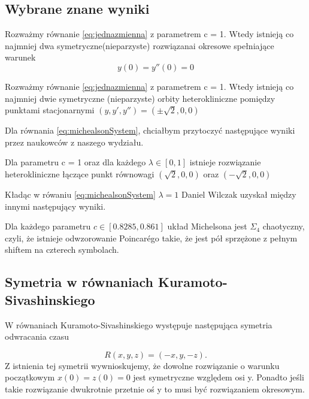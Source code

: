 \subsection{Wybrane znane wyniki} 

\begin{theorem}[Troy]
 
Rozważmy równanie \ref{eq:jednazmienna} z parametrem c = 1. Wtedy istnieją co najmniej dwa symetryczne(nieparzyste) rozwiązanai okresowe
spełniające warunek
$$
    y(0) = y''(0) = 0
$$
\end{theorem}

\begin{theorem} [Troy]
 Rozważmy równanie \ref{eq:jednazmienna} z parametrem c = 1. Wtedy istnieją co najmniej dwie symetryczne (nieparzyste) orbity
 heterokliniczne pomiędzy punktami stacjonarnymi $(y,y',y'') = (\pm \sqrt{2},0,0)$
 
\end{theorem}
Dla równania \eqref{eq:michealsonSystem}, chciałbym przytoczyć następujące wyniki przez naukowców z naszego wydziału.


\begin{theorem} 
  Dla parametru c = 1 oraz dla każdego $ \lambda \in [0,1] $ istnieje rozwiązanie heterokliniczne łączące punkt równowagi $(\sqrt{2},0,0) $ 
  oraz $(-\sqrt{2},0,0)$
 
\end{theorem}

Kładąc w rówaniu \eqref{eq:michealsonSystem} $ \lambda = 1 $
Daniel Wilczak uzyskał między innymi następujący wyniki.

\begin{theorem}[Wilczak]
  Dla każdego parametru $ c \in [0.8285,0.861] $ układ Michelsona jest $ \Sigma_4 $ chaotyczny,
  czyli, że istnieje odwzorowanie Poincar\'ego takie, że jest pół sprzężone z pełnym shiftem na czterech symbolach.
\end{theorem}


\subsection{Symetria w równaniach Kuramoto-Sivashinskiego}

W równaniach Kuramoto-Sivashinskiego występuje następująca symetria odwracania czasu 

$$
  R(x,y,z) = (-x,y,-z).
$$
Z istnienia tej symetrii wywnioskujemy, że dowolne rozwiązanie o warunku początkowym $x(0) = z(0) = 0 $ 
jest symetryczne względem osi y. Ponadto jeśli takie rozwiązanie dwukrotnie przetnie oś y to musi być rozwiązaniem okresowym.



